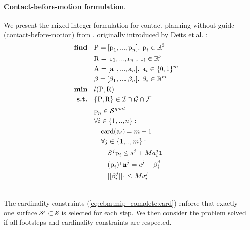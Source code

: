 \paragraph{Contact-before-motion formulation.\label{par:cbm:formulation}}
We present the mixed-integer formulation for contact planning without guide (contact-before-motion) from \cite{sl1m_v2}, originally introduced by Deits et al. \cite{deits2014FootPlanMI}:
\begin{align}
    \textrm{\textbf{find}}  \quad & \mbox{P}=[\mbox{p}_1,...,\mbox{p}_n], \;\mbox{p}_i \in \mathbb{R}^{3} \nonumber\\
                            \quad & \mbox{R}=[\mbox{r}_1,...,\mbox{r}_n], \; \mbox{r}_i \in \mathbb{R}^{3} \nonumber\\
                            \quad & \mbox{A}=[\mbox{a}_1,...,\mbox{a}_n], \; \mbox{a}_i \in \{0,1\}^{m} \nonumber \\
                            \quad & \beta=[\beta_1,...,\beta_n], \; \beta_i \in \mathbb{R}^{m} \nonumber\\
    \textrm{\textbf{min}}  \quad & l(\mbox{P},\mbox{R}) \nonumber\\
    \textrm{\textbf{s.t.}}  \quad & \{\mbox{P},\mbox{R}\} \in \mathcal{I} \cap \mathcal{G} \cap \mathcal{F} \nonumber\\
                            \quad &\mbox{p}_n \in \mathcal{S}^{goal} \nonumber\\
                            \quad & \forall i \in \{1,..,n\} : \nonumber\\
                                \quad & \quad \mbox{card}(\mbox{a}_i) = m-1 \label{eq:cbm:mip_complete:card}\\
                                \quad & \quad \forall j \in \{1,..,m\} : \nonumber\\
                                    \quad & \quad \quad S^j\mbox{p}_i \leq s^j + M a_i^j \textbf{1} \nonumber\\
                                    \quad & \quad \quad (\mbox{p}_i)^{\intercal} \textbf{n}^j = e^j + \beta_i^j \nonumber\\
                                    \quad & \quad \quad ||\beta_i^j||_1 \leq M a_i^j \nonumber\\
                                    \nonumber
\end{align}

The cardinality constraints (\ref{eq:cbm:mip_complete:card}) enforce that exactly one surface $\mathcal{S}^j \subset \mathcal{S}$ is selected for each step.
We then consider the problem solved if all footsteps and cardinality constraints are respected.

